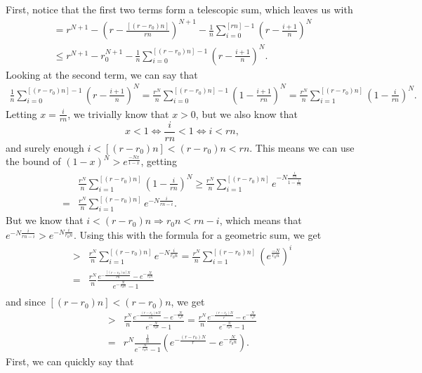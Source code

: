     First, notice that the first two terms form a telescopic sum, which leaves us with
    \begin{align}
        =r^{N+1} - (r-\frac{[(r-r_0)n]}{rn})^{N+1} - \frac{1}{n}\sum_{i=0}^{[rn]-1}(r-\frac{i+1}{n})^N\nonumber\\        
        \leq r^{N+1} - r_0^{N+1} -\frac{1}{n}\sum_{i=0}^{[(r-r_0)n]-1}(r-\frac{i+1}{n})^N.
    \end{align}
    Looking at the second term, we can say that
    \begin{align*}
        \frac{1}{n}\sum_{i=0}^{[(r-r_0)n]-1}(r-\frac{i+1}{n})^N=\frac{r^N}{n}\sum_{i=0}^{[(r-r_0)n]-1}(1-\frac{i+1}{rn})^N=\frac{r^N}{n}\sum_{i=1}^{[(r-r_0)n]}(1-\frac{i}{rn})^N.
    \end{align*}
    Letting \(x=\frac{i}{rn}\), we trivially know that $x>0$, but we also know that
    \[
        x<1 \iff \frac{i}{rn} < 1 \iff i < rn,
    \]
    and surely enough \(i<[(r-r_0)n]<(r-r_0)n<rn\). This means we can use the bound of \({(1-x)^N>e^{\frac{-Nx}{1-x}}}\), getting
    \begin{align*}
        &\frac{r^N}{n}\sum_{i=1}^{[(r-r_0)n]}(1-\frac{i}{rn})^N\geq\frac{r^N}{n}\sum_{i=1}^{[(r-r_0)n]}e^{-N\frac{\frac{i}{rn}}{1-\frac{i}{rn}}}\\
        =&\frac{r^N}{n}\sum_{i=1}^{[(r-r_0)n]}e^{-N\frac{i}{rn-i}}.
    \end{align*}
    But we know that $i<(r-r_0)n\Rightarrow r_0n<rn-i$, which means that ${e^{-N\frac{i}{rn-i}}>e^{-N\frac{i}{r_0n}}}$. Using this with the formula for a geometric sum, we get
    \begin{align*}
        >&\frac{r^N}{n}\sum_{i=1}^{[(r-r_0)n]}e^{-N\frac{i}{r_0n}}= \frac{r^N}{n}\sum_{i=1}^{[(r-r_0)n]}\left(e^{\frac{-N}{r_0n}}\right)^i\\
        =&\frac{r^N}{n}\frac{e^{-\frac{[(r-r_0)n]N}{rn}} - e^{-\frac{N}{r_0n}}}{e^{-\frac{N}{r_0n}} - 1}\\
    \end{align*}
    and since $[(r-r_0)n]<(r-r_0)n$, we get
    \begin{align*}
        >& \frac{r^N}{n}\frac{e^{-\frac{(r-r_0)nN}{rn}} - e^{-\frac{N}{r_0n}}}{e^{-\frac{N}{r_0n}} - 1}
        = \frac{r^N}{n}\frac{e^{-\frac{(r-r_0)N}{r}} - e^{-\frac{N}{r_0n}}}{e^{-\frac{N}{r_0n}} - 1}\\
        =& r^N\frac{\frac{1}{n}}{e^{-\frac{N}{r_0n}} - 1}\left(e^{-\frac{(r-r_0)N}{r}} - e^{-\frac{N}{r_0n}}\right).
    \end{align*}
    First, we can quickly say that
